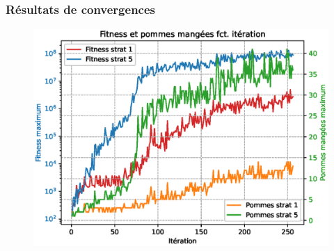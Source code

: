 \documentclass[10pt]{beamer}
\begin{document}
\begin{frame}
\frametitle{Résultats de convergences}
\begin{figure}
\vspace{-1.1cm}\hspace{-0.6cm}
\includegraphics[width=1\textwidth]{curve_compare_cv.eps}
\end{figure}

\end{frame}
\end{document}
